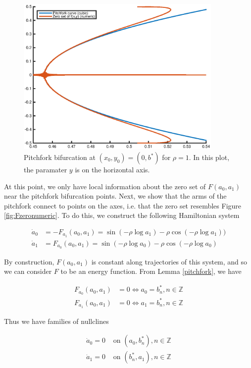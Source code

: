 \documentclass[12pt]{article}
\def\Z{{\mathbb Z}}
\begin{document}
\begin{figure}[H]
\includegraphics[width=10cm]{pitchfork.eps}
\caption{Pitchfork bifurcation at $(x_0, y_0) = (0, b^*)$ for $\rho = 1$. In this plot, the paramater $y$ is on the horizontal axis.}
\end{figure}

At this point, we only have local information about the zero set of $F(a_0, a_1)$ near the pitchfork bifurcation points. Next, we show that the arms of the pitchfork connect to points on the axes, i.e. that the zero set resembles Figure \ref{fig:Fzeronumeric}. To do this, we construct the following Hamiltonian system

\begin{align}
\dot a_0 &= -F_{a_1}(a_0, a_1) = \sin(-\rho \log a_1) 
- \rho \cos( -\rho \log a_1 )) \\
\dot a_1 &= F_{a_0}(a_0, a_1) = \sin(-\rho \log a_0) 
-\rho \cos( -\rho \log a_0 )
\end{align}

By construction, $F(a_0, a_1)$ is constant along trajectories of this system, and so we can consider $F$ to be an energy function. From Lemma \ref{pitchfork}, we have

\begin{align*}
F_{a_0}(a_0, a_1) &= 0 \iff a_0 = b^*_n, n \in \Z \\
F_{a_1}(a_0, a_1) &= 0 \iff a_1 = b^*_n, n \in \Z
\end{align*}

Thus we have families of nullclines

\begin{align*}
\dot a_0 = 0 &\text{ on } (a_0, b^*_n), n \in \Z \\
\dot a_1 = 0 &\text{ on } (b^*_n, a_1), n \in \Z
\end{align*}
\end{document}
